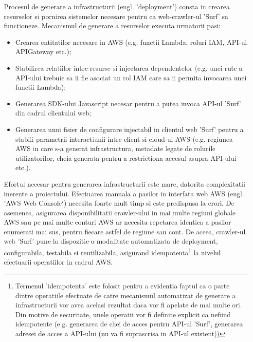\newcommand{\descriereIdempotenta}{Termenul 'idempotenta' este folosit pentru a evidentia faptul ca o parte dintre operatiile efectuate de catre mecanismul automatizat de generare a infrastructurii vor avea acelasi rezultat daca vor fi apelate de mai multe ori. Din motive de securitate, unele operatii vor fi definite explicit ca nefiind idempotente (e.g. generarea de chei de acces pentru API-ul 'Surf', generarea adresei de acces a API-ului (nu va fi suprascrisa in API-ul existent)) }

Procesul de generare a infrastructurii (engl. 'deployment') consta in crearea resurselor si pornirea sistemelor necesare pentru ca web-crawler-ul 'Surf' sa functioneze. Mecanismul de generare a resurselor executa urmatorii pasi:

\begin{itemize}

	\item{Crearea entitatilor necesare in AWS (e.g. functii Lambda, roluri IAM, API-ul APIGateway etc.);}
	
	\item{Stabilirea relatiilor intre resurse si injectarea dependentelor (e.g. unei rute a API-ului trebuie sa ii fie asociat un rol IAM care sa ii permita invocarea unei functii Lambda);}
	
	\item{Generarea SDK-ului Javascript necesar pentru a putea invoca API-ul 'Surf' din cadrul clientului web;}
	
	\item{Generarea unui fisier de configurare injectabil in clientul web 'Surf' pentru a stabili parametrii interactiunii intre client si cloud-ul AWS (e.g. regiunea AWS in care s-a generat infrastructura, metadate legate de rolurile utilizatorilor, cheia generata pentru a restrictiona accesul asupra API-ului etc.).}

\end{itemize}

Efortul necesar pentru generarea infrastructurii este mare, datorita complexitatii inerente a proiectului. Efectuarea manuala a pasilor in interfata web AWS (engl. 'AWS Web Console`) necesita foarte mult timp si este predispusa la erori. De asemenea, asigurarea disponibilitatii crawler-ului in mai multe regiuni globale AWS sau pe mai multe conturi AWS ar necesita repetarea identica a pasilor enumerati mai sus, pentru fiecare astfel de regiune sau cont. De aceea, crawler-ul web 'Surf' pune la dispozitie o modalitate automatizata de deployment, configurabila, testabila si reutilizabila, asigurand idempotenta\footnote{\descriereIdempotenta} la nivelul efectuarii operatiilor in cadrul AWS.

